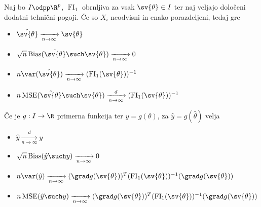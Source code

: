 \begin{izrek}
  Naj bo $I \odpp\R^p$, $\operatorname{FI}_1$ obrnljiva za vsak $\sv{\theta} \in
  I$ ter naj veljajo določeni dodatni tehnični pogoji.
  Če so $X_i$ neodvisni in enako porazdeljeni, tedaj gre
  \begin{itemize}
  \item $\hat{\sv{\theta}} \xrightarrow[n \to \infty]{} \sv{\theta}$
  \item $\sqrt{n} \operatorname{Bias}(\hat{\sv{\theta}} \such \sv{\theta})
	\xrightarrow[n \to \infty]{} 0$
  \item $n \var(\hat{\sv{\theta}}) \xrightarrow[n \to \infty]{} (\operatorname{FI}_1(\sv{\theta}))^{-1}$
  \item $n \operatorname{MSE}(\hat{\sv{\theta}} \such \sv{\theta})
	\xrightarrow[n \to \infty]{d} (\operatorname{FI}_1(\sv{\theta}))^{-1}$
  \end{itemize}
  Če je $g: I \to \R$ primerna funkcija ter $y = g(\theta)$, za $\hat{y} =
  g(\hat{\theta})$ velja
  \begin{itemize}
  \item $\hat{y} \xrightarrow[n \to \infty]{d} y$
  \item $\sqrt{n} \operatorname{Bias}(\hat{y} \such y) \xrightarrow[n \to
	\infty]{} 0$
  \item $n \var(\hat{y}) \xrightarrow[n \to \infty]{} (\grad g(\sv{\theta}))^T
	(\operatorname{FI}_1(\sv{\theta}))^{-1} (\grad g(\sv{\theta}))$
  \item $n \operatorname{MSE}(\hat{y} \such y) \xrightarrow[n \to \infty]{}
	(\grad g(\sv{\theta}))^T (\operatorname{FI}_1(\sv{\theta}))^{-1} (\grad
	g(\sv{\theta}))$
  \end{itemize}
\end{izrek}


